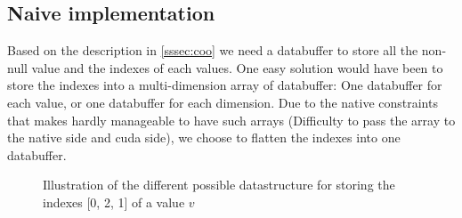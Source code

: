 \subsection{Naive implementation}

Based on the description in \ref{sssec:coo} we need a databuffer to store all the non-null value and the indexes of each values. One easy solution would have been to store the indexes into a multi-dimension array of databuffer: One databuffer for each value, or one databuffer for each dimension. Due to the native constraints that makes hardly manageable to have such arrays (Difficulty to pass the array to the native side and cuda side), we choose to flatten the indexes into one databuffer.

\begin{figure}[!h]
	\hfill
	\caption{Illustration of the different possible datastructure for storing the indexes  [0, 2, 1] of a value $v$ }
\end{figure}

